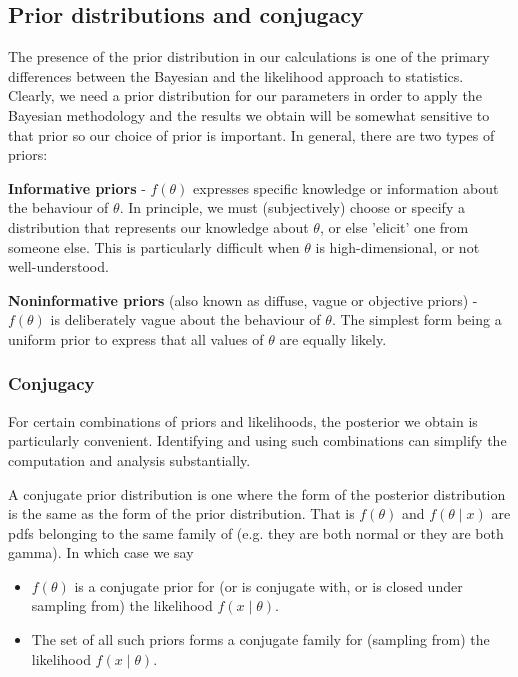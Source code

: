 \documentclass[10pt, a4paper]{article}
\begin{document}
\subsection{Prior distributions and conjugacy}
The presence of the prior distribution in our calculations is one of the primary differences between the Bayesian and the likelihood approach to statistics.
Clearly,
we need a prior distribution for our parameters in order to apply the Bayesian methodology and the results we obtain will be somewhat sensitive to that prior so our choice of prior is important.
In general,
there are two types of priors:

\textbf{Informative priors} -
$f(\theta)$ expresses specific knowledge or information about the behaviour of $\theta$.
In principle,
we must
(subjectively)
choose or specify a distribution that represents our knowledge about $\theta$,
or else 'elicit' one from someone else.
This is particularly difficult when $\theta$ is high-dimensional,
or not well-understood.

\textbf{Noninformative priors}
(also known as diffuse,
vague or objective priors) -
$f(\theta)$ is deliberately vague about the behaviour of $\theta$.
The simplest form being a uniform prior to express that all values of $\theta$ are equally likely.

\subsubsection{Conjugacy}
For certain combinations of priors and likelihoods,
the posterior we obtain is particularly convenient.
Identifying and using such combinations can simplify the computation and analysis substantially.

\begin{definition}[Conjugacy]
    A conjugate prior distribution is one where the form of the posterior distribution is the same as the form of the prior distribution.
    That is $f(\theta)$ and $f(\theta \mid x)$ are pdfs belonging to the same family of
    (e.g. they are both normal or they are both gamma).
    In which case we say
    \begin{itemize}
        \item $f(\theta)$ is a conjugate prior for
        (or is conjugate with,
        or is closed under sampling from)
        the likelihood $f(x \mid \theta)$.

        \item The set of all such priors forms a conjugate family for
        (sampling from)
        the likelihood $f(x \mid \theta)$.
    \end{itemize}
\end{definition}
\end{document}
